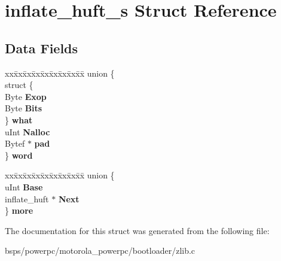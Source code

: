 \hypertarget{structinflate__huft__s}{}\section{inflate\+\_\+huft\+\_\+s Struct Reference}
\label{structinflate__huft__s}
\subsection*{Data Fields}
\begin{DoxyCompactItemize}
\item 
\mbox{\label{structinflate__huft__s_afd8413493b2b6fb09fae20f07345ca20}} 
\begin{tabbing}
xx\=xx\=xx\=xx\=xx\=xx\=xx\=xx\=xx\=\kill
union \{\\
\>struct \{\\
\>\>Byte {\bfseries Exop}\\
\>\>Byte {\bfseries Bits}\\
\>\} {\bfseries what}\\
\>uInt {\bfseries Nalloc}\\
\>Bytef $\ast$ {\bfseries pad}\\
\} {\bfseries word}\\

\end{tabbing}\item 
\mbox{\label{structinflate__huft__s_a7367514c5d30f124f343e2448c2244fd}} 
\begin{tabbing}
xx\=xx\=xx\=xx\=xx\=xx\=xx\=xx\=xx\=\kill
union \{\\
\>uInt {\bfseries Base}\\
\>inflate\_huft $\ast$ {\bfseries Next}\\
\} {\bfseries more}\\

\end{tabbing}\end{DoxyCompactItemize}


The documentation for this struct was generated from the following file\+:\begin{DoxyCompactItemize}
\item 
bsps/powerpc/motorola\+\_\+powerpc/bootloader/zlib.\+c\end{DoxyCompactItemize}
